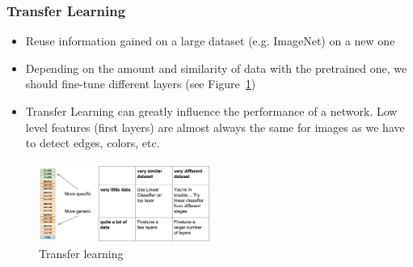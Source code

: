 \subsubsection{Transfer Learning}
\begin{itemize}
	\item Reuse information gained on a large dataset (e.g. ImageNet) on a new one
	\item Depending on the amount and similarity of data with the pretrained one, we should fine-tune different layers (see Figure~\ref{fig:transfer_learning})
	\item Transfer Learning can greatly influence the performance of a network. Low level features (first layers) are almost always the same for images as we have to detect edges, colors, etc.
\end{itemize}
\begin{figure}[ht!]
	\centering
	\includegraphics[width=0.5\textwidth]{figures/cv_deep_learning_transfer_learning.png}
	\caption{Transfer learning}
	\label{fig:transfer_learning}
\end{figure}
